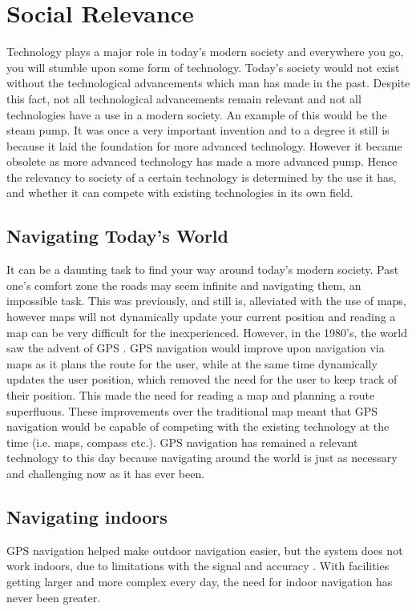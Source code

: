 \section{Social Relevance}


Technology plays a major role in today's modern society and everywhere you go, you will stumble upon some form of technology. Today's society would not exist without the technological advancements which man has made in the past. Despite this fact, not all technological advancements remain relevant and not all technologies have a use in a modern society. An example of this would be the steam pump. It was once a very important invention and to a degree it still is because it laid the foundation for more advanced technology. However it became obsolete as more advanced technology has made a more advanced pump. Hence the relevancy to society of a certain technology is determined by the use it has, and whether it can compete with existing technologies in its own field.

\subsection{Navigating Today's World}
It can be a daunting task to find your way around today's modern society. Past one's comfort zone the roads may seem infinite and navigating them, an impossible task. This was previously, and still is, alleviated with the use of maps, however maps will not dynamically update your current position and reading a map can be very difficult for the inexperienced. However, in the 1980's, the world saw the advent of GPS \cite{gps_advent}. GPS navigation would improve upon navigation via maps as it plans the route for the user, while at the same time dynamically updates the user position, which removed the need for the user to keep track of their position. This made the need for reading a map and planning a route superfluous. These improvements over the traditional map meant that GPS navigation would be capable of competing with the existing technology at the time (i.e. maps, compass etc.). GPS navigation has remained a relevant technology to this day because navigating around the world is just as necessary and challenging now as it has ever been.

\subsection{Navigating indoors}
GPS navigation helped make outdoor navigation easier, but the system does not work indoors, due to limitations with the signal and accuracy \cite{gps_tech}. With facilities getting larger and more complex every day, the need for indoor navigation has never been greater.

